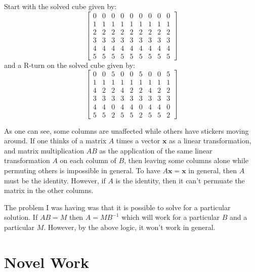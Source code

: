 \documentclass[11pt, oneside]{article}
\newcommand{\ve}[1]{\mathbf{#1}}
\begin{document}
Start with the solved cube given by:
\[ \begin{bmatrix}
0 & 0 & 0 & 0 & 0 & 0 & 0 & 0 & 0 \\
1 & 1 & 1 & 1 & 1 & 1 & 1 & 1 & 1 \\
2 & 2 & 2 & 2 & 2 & 2 & 2 & 2 & 2 \\
3 & 3 & 3 & 3 & 3 & 3 & 3 & 3 & 3 \\
4 & 4 & 4 & 4 & 4 & 4 & 4 & 4 & 4 \\
5 & 5 & 5 & 5 & 5 & 5 & 5 & 5 & 5
\end{bmatrix} \]
and a R-turn on the solved cube given by:
\[ \begin{bmatrix}
0 & 0 & 5 & 0 & 0 & 5 & 0 & 0 & 5 \\
1 & 1 & 1 & 1 & 1 & 1 & 1 & 1 & 1 \\
4 & 2 & 2 & 4 & 2 & 2 & 4 & 2 & 2 \\
3 & 3 & 3 & 3 & 3 & 3 & 3 & 3 & 3 \\
4 & 4 & 0 & 4 & 4 & 0 & 4 & 4 & 0 \\
5 & 5 & 2 & 5 & 5 & 2 & 5 & 5 & 2
\end{bmatrix} \]

As one can see, some columns are unaffected while others have stickers moving around.
If one thinks of a matrix \( A \) times a vector \( \ve{x} \) as a linear transformation,
and matrix multiplication \( AB \) as the application of the same linear transformation \( A \)
on each column of \( B \), then leaving some columns alone while permuting others is impossible in general.
To have \( A\ve{x} = \ve{x} \) in general, then \( A \) must be the identity.
However, if \( A \) is the identity, then it can't permuate the matrix in the other columns.

The problem I was having was that it is possible to solve for a particular solution.
If \( AB = M \) then \( A = MB^{-1} \) which will work for a particular \( B \) and a particular \( M \).
However, by the above logic, it won't work in general.

\section{Novel Work}
\end{document}
